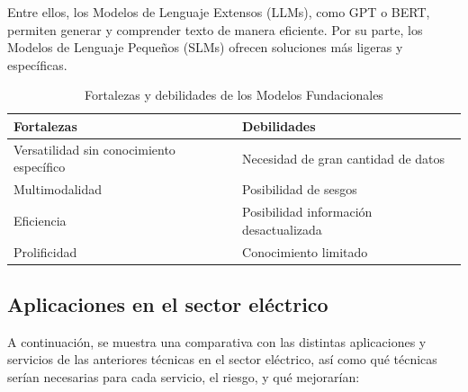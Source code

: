 Entre ellos, los Modelos de Lenguaje Extensos (LLMs), como GPT o BERT, permiten generar y 
comprender texto de manera eficiente. Por su parte, los Modelos de Lenguaje Pequeños (SLMs) ofrecen 
soluciones más ligeras y específicas. 

\begin{table}[H]
\centering
\begin{tabularx}{\textwidth}{X|X}
    \textbf{Fortalezas} & \textbf{Debilidades} \\ \hline
    Versatilidad sin conocimiento específico & Necesidad de gran cantidad de datos \\ 
    Multimodalidad & Posibilidad de sesgos \\
    Eficiencia & Posibilidad información desactualizada \\ 
    Prolificidad & Conocimiento limitado \\ 
\end{tabularx}
\caption{Fortalezas y debilidades de los Modelos Fundacionales}
\end{table}

\subsection{Aplicaciones en el sector eléctrico}

A continuación, se muestra una comparativa con las distintas aplicaciones y servicios de las 
anteriores técnicas en el sector eléctrico, así como qué técnicas serían necesarias para cada 
servicio, el riesgo, y qué mejorarían:


\newcommand{\cmark}{\ding{51}} %



